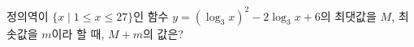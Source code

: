 정의역이 $\{x \mid 1\le x\le 27\}$인 함수 $y=(\log_3 x)^2-2\log_3 x+6$의 최댓값을 $M$, 최솟값을 $m$이라 할 때, $M+m$의 값은?
